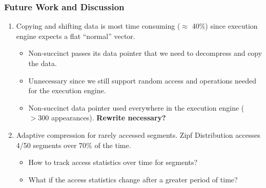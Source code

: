 \documentclass[aspectratio=43]{beamer}
\begin{document}
\begin{frame}
    \frametitle{Future Work and Discussion}

    \begin{enumerate}

    \item Copying and shifting data is most time consuming ($\approx$ 40\%) since execution engine expects a 
    flat ``normal'' vector.
    \begin{itemize}
        \item Non-succinct passes its data pointer that we need to decompress and copy the data.
        \item Unnecessary since we still support random access and operations needed for the execution engine.
        \item Non-succinct data pointer used everywhere in the execution engine ($>300$ appearances). 
        \textbf{Rewrite necessary?}
    \end{itemize}

    \vspace{0.3cm} 

    \item Adaptive compression for rarely accessed segments. 
    Zipf Distribution accesses 4/50 segments over $70\%$ of the time.
    \begin{itemize}
        \item How to track access statistics over time for segments?
        \item What if the access statistics change after a greater period of time?
    \end{itemize}
\end{enumerate}

\end{frame}
\end{document}
